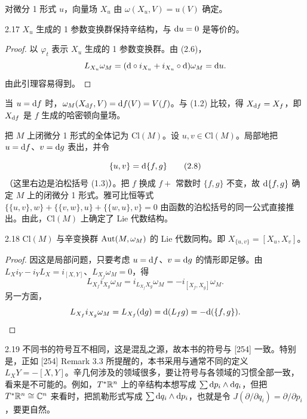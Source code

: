对微分 1 形式 $u$，向量场 $X_u$ 由 $\omega(X_u,V)=u(V)$ 确定。

\begin{lemma*}{2.17}
  $X_u$ 生成的 1 参数变换群保持辛结构，与 $\mathrm{d} u=0$ 是等价的。
\end{lemma*}

\begin{proof}
  以 $\varphi_t$ 表示 $X_u$ 生成的 1 参数变换群。由 (2.6)，
  \[
    L_{X_u}\omega_M=(\mathrm{d}\circ i_{X_u}+i_{X_u}\circ\mathrm{d})\omega_M=\mathrm{d} u.
  \]
  由此引理容易得到。
\end{proof}

当 $u=\mathrm{d} f$ 时，$\omega_M(X_{\mathrm{d} f},V)=\mathrm{d} f(V)=V(f)$。与 (1.2) 比较，得 $X_{\mathrm{d} f}=X_f$，即 $X_{\mathrm{d} f}$ 是 $f$ 生成的哈密顿向量场。

把 $M$ 上闭微分 1 形式的全体记为 $\mathrm{Cl}(M)$。设 $u,v\in\mathrm{Cl}(M)$。局部地把 $u=\mathrm{d} f$、$v=\mathrm{d} g$ 表出，并令

\begin{equation}
  \{u,v\}=\mathrm{d}\{f,g\} \tag{2.8}
\end{equation}
（这里右边是泊松括号 (1.3)）。把 $f$ 换成 $f+$ 常数时 $\{f,g\}$ 不变，故 $\mathrm{d}\{f,g\}$ 确定 $M$ 上的闭微分 1 形式。雅可比恒等式 $\{\{u,v\},w\}+\{\{v,w\},u\}+\{\{w,u\},v\}=0$ 由函数的泊松括号的同一公式直接推出。由此，$\mathrm{Cl}(M)$ 上确定了 Lie 代数结构。

\begin{theorem*}{2.18}
  $\mathrm{Cl}(M)$ 与辛变换群 $\operatorname{Aut}(M,\omega_M)$ 的 Lie 代数同构。即 $X_{\{u,v\}}=[X_u,X_v]$。
\end{theorem*}

\begin{proof}
  因这是局部问题，只要考虑 $u=\mathrm{d} f$、$v=\mathrm{d} g$ 的情形即足够。由 $L_Xi_Y-i_YL_X=i_{[X,Y]}$、$L_{X_f}\omega_M=0$，得
  \[
    L_{X_f}i_{X_g}\omega_M=i_{L_{X_f}X_g}\omega_M=-i_{[X_f,X_g]}\omega_M.
  \]
  另一方面，
  \[
    L_{X_f}i_{X_g}\omega_M=L_{X_f}(\mathrm{d} g)=\mathrm{d}(L_fg)=-\mathrm{d}(\{f,g\}).
  \]
\end{proof}

\begin{remark}{2.19}
  不同书的符号互不相同，这是混乱之源，故本书的符号与 [254] 一致。特别是，正如 [254] Remark 3.3 所提醒的，本书采用与通常不同的定义 $L_XY=-[X,Y]$。辛几何涉及的领域很多，要让符号与各领域的习惯全部一致，看来是不可能的。例如，$T^*\mathbb{R}^n$ 上的辛结构本想写成 $\sum \mathrm{d} p_i\wedge\mathrm{d} q_i$，但把 $T^*\mathbb{R}^n\cong\mathbb{C}^n$ 来看时，把凯勒形式写成 $\sum \mathrm{d} q_i\wedge\mathrm{d} p_i$，也就是令 $J(\partial/\partial q_i)=\partial/\partial p_i$，要更自然。
\end{remark}

